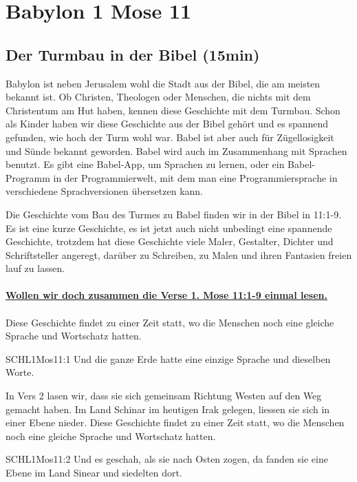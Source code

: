 \documentclass[14pt]{../../inc/mybib}
\author{Lothar Schmid}
\begin{document}
\setlength{\baselineskip}{1.5\baselineskip}
\section{Babylon 1 Mose 11}

\subsection{Der Turmbau in der Bibel (15min)}        
    Babylon ist neben Jerusalem wohl die Stadt aus der Bibel, die am meisten bekannt ist. Ob Christen, Theologen oder Menschen, die nichts mit dem Christentum am Hut haben, kennen diese Geschichte mit dem Turmbau. Schon als Kinder haben wir diese Geschichte aus der Bibel gehört und es spannend gefunden, wie hoch der Turm wohl war. Babel ist aber auch für Zügellosigkeit und Sünde bekannt geworden. Babel wird auch im Zusammenhang mit Sprachen benutzt. Es gibt eine Babel-App, um Sprachen zu lernen, oder ein Babel-Programm in der Programmierwelt, mit dem man eine Programmiersprache in verschiedene Sprachversionen übersetzen kann.
    
    Die Geschichte vom Bau des Turmes zu Babel finden wir in der Bibel in  {11:1-9}. Es ist eine kurze Geschichte, es ist jetzt auch nicht unbedingt eine spannende Geschichte, trotzdem hat diese Geschichte viele Maler, Gestalter, Dichter und Schriftsteller angeregt, darüber zu Schreiben, zu Malen und ihren Fantasien freien lauf zu lassen. 
    \\
    \\
    \underline{\textbf{Wollen wir doch zusammen die Verse 1. Mose 11:1-9 einmal lesen.}}
    \\
    \\
    Diese Geschichte findet zu einer Zeit statt, wo die Menschen noch eine gleiche Sprache und Wortschatz hatten.
    \begin{bibelbox}{SCHL}{1Mos}{11:1}
        Und die ganze Erde hatte eine einzige Sprache und dieselben Worte.
    \end{bibelbox}
    
    In Vers 2 lasen wir, dass sie sich gemeinsam Richtung Westen auf den Weg gemacht haben. Im Land Schinar im heutigen Irak gelegen, liessen sie sich in einer Ebene nieder.
    Diese Geschichte findet zu einer Zeit statt, wo die Menschen noch eine gleiche Sprache und Wortschatz hatten.
    \begin{bibelbox}{SCHL}{1Mos}{11:2}
        Und es geschah, als sie nach Osten zogen, da fanden sie eine Ebene im Land Sinear und siedelten dort.
    \end{bibelbox}
\end{document}
